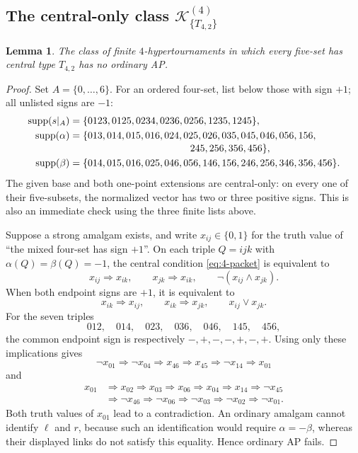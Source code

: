 \documentclass[11pt,a4paper]{article}
\newtheorem{lemma}[theorem]{Lemma}
\theoremstyle{remark}
\newcommand{\K}{\mathcal K}
\newcommand{\supp}{\operatorname{supp}}
\begin{document}
\subsection{The central-only class $\K^{(4)}_{\{T_{4,2}\}}$}
\begin{lemma}\label{lem:4-central}
The class of finite $4$-hypertournaments in which every five-set has
central type $T_{4,2}$ has no ordinary AP.
\end{lemma}
\begin{proof}
Set $A=\{0,\ldots,6\}$.  For an ordered four-set, list below those
with sign $+1$; all unlisted signs are $-1$:
\begin{align*}
\supp(s|_A)&=\{0123,0125,0234,0236,0256,1235,1245\},\\
\supp(\alpha)&=\{013,014,015,016,024,025,026,035,045,046,056,156,\\[-2pt]
 &\hspace{43mm}245,256,356,456\},\\
\supp(\beta)&=\{014,015,016,025,046,056,146,156,246,256,346,356,456\}.
\end{align*}
The given base and both one-point extensions are central-only: on
every one of their five-subsets, the normalized vector has two or three
positive signs.  This is also an immediate check using the three
finite lists above.

Suppose a strong amalgam exists, and write $x_{ij}\in\{0,1\}$ for the
truth value of ``the mixed four-set has sign $+1$''.  On each triple
$Q=ijk$ with $\alpha(Q)=\beta(Q)=-1$, the central condition
\eqref{eq:4-packet} is equivalent to
\[
 x_{ij}\Rightarrow x_{ik},\qquad
 x_{jk}\Rightarrow x_{ik},\qquad
 \neg(x_{ij}\wedge x_{jk}). \tag{$-$}
\]
When both endpoint signs are $+1$, it is equivalent to
\[
 x_{ik}\Rightarrow x_{ij},\qquad
 x_{ik}\Rightarrow x_{jk},\qquad
 x_{ij}\vee x_{jk}. \tag{$+$}
\]
For the seven triples
\[
 012,\quad014,\quad023,\quad036,\quad046,\quad145,\quad456,
\]
the common endpoint sign is respectively
$-,+,-,-,+,-,+$.  Using only these implications gives
\[
 \neg x_{01}\Rightarrow\neg x_{04}\Rightarrow x_{46}
 \Rightarrow x_{45}\Rightarrow\neg x_{14}\Rightarrow x_{01}
\]
and
\[
\begin{split}
 x_{01}&\Rightarrow x_{02}\Rightarrow x_{03}\Rightarrow x_{06}
 \Rightarrow x_{04}\Rightarrow x_{14}\Rightarrow\neg x_{45}\\
 &\Rightarrow\neg x_{46}\Rightarrow\neg x_{06}
 \Rightarrow\neg x_{03}\Rightarrow\neg x_{02}
 \Rightarrow\neg x_{01}.
\end{split}
\]
Both truth values of $x_{01}$ lead to a contradiction.  An ordinary
amalgam cannot identify $\ell$ and $r$, because such an identification
would require $\alpha=-\beta$, whereas their displayed links do not
satisfy this equality.  Hence ordinary AP fails.
\end{proof}
\end{document}
